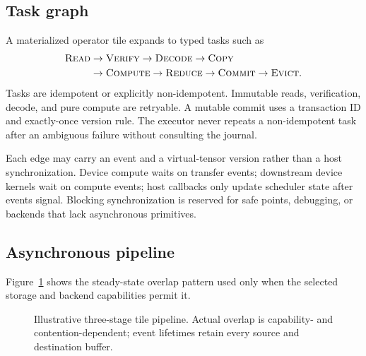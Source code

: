 \subsection{Task graph}

A materialized operator tile expands to typed tasks such as
\[
\begin{aligned}
\textsc{Read}&\to\textsc{Verify}\to\textsc{Decode}\to\textsc{Copy}\\
&\to\textsc{Compute}\to\textsc{Reduce}\to\textsc{Commit}\to\textsc{Evict}.
\end{aligned}
\]
Tasks are idempotent or explicitly non-idempotent. Immutable reads, verification, decode, and pure compute are retryable. A mutable commit uses a transaction ID and exactly-once version rule. The executor never repeats a non-idempotent task after an ambiguous failure without consulting the journal.

Each edge may carry an event and a virtual-tensor version rather than a host synchronization. Device compute waits on transfer events; downstream device kernels wait on compute events; host callbacks only update scheduler state after events signal. Blocking synchronization is reserved for safe points, debugging, or backends that lack asynchronous primitives.

\subsection{Asynchronous pipeline}
Figure~\ref{fig:pipeline} shows the steady-state overlap pattern used only when the selected storage and backend capabilities permit it.

\begin{figure}[H]
\centering
{}
\caption{Illustrative three-stage tile pipeline. Actual overlap is capability- and contention-dependent; event lifetimes retain every source and destination buffer.}
\label{fig:pipeline}
\end{figure}

